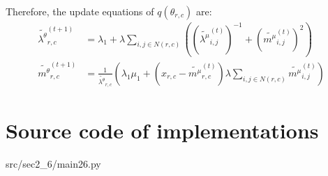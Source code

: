 \documentclass[12pt]{article}
\newenvironment{problem}[2][Problem]{\begin{trivlist}
\item[\hskip \labelsep {\bfseries #1}\hskip \labelsep {\bfseries #2.}]}{\end{trivlist}}
\begin{document}
\begin{problem}{2.9.25}
Therefore, the update equations of $q(\theta_{r,c})$ are:
\begin{align*}
    \tilde{\lambda^{\theta}}_{r,c}^{(t+1)}
    &= \lambda_1 + \lambda\sum_{i,j \in N(r,c)}((\tilde{\lambda^{\mu}}^{(t)}_{i,j})^{-1} + (\tilde{m^{\mu}}_{i,j}^{(t)})^2) \\
    \tilde{m^{\theta}}_{r,c}^{(t+1)}
    &= \frac{1}{\tilde{\lambda^{\theta}}_{r,c}}
    (\lambda_1\mu_1 + (x_{r,c} - \tilde{m^{\mu}}_{r,c}^{(t)})\lambda\sum_{i,j \in N(r,c)}\tilde{m^{\mu}}_{i,j}^{(t)})
\end{align*}
\end{problem} %



\pagebreak
\appendix
\section{Source code of implementations}

                 {src/sec2_6/main26.py}
\pagebreak

\end{document}
